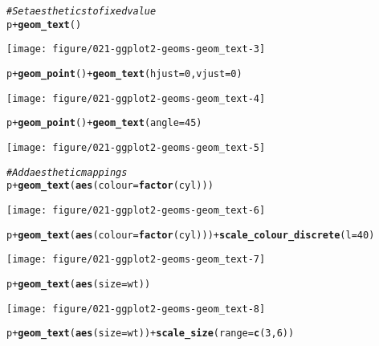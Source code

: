\documentclass[a4paper,titlepage]{tufte-handout}\usepackage[]{graphicx}\usepackage[]{color}
\makeatletter
\def\maxwidth{ %
  \ifdim\Gin@nat@width>\linewidth
    \linewidth
  \else
    \Gin@nat@width
  \fi
}
\newcommand{\hlnum}[1]{\textcolor[rgb]{0.686,0.059,0.569}{#1}}%
\newcommand{\hlcom}[1]{\textcolor[rgb]{0.678,0.584,0.686}{\textit{#1}}}%
\newcommand{\hlopt}[1]{\textcolor[rgb]{0,0,0}{#1}}%
\newcommand{\hlstd}[1]{\textcolor[rgb]{0.345,0.345,0.345}{#1}}%
\newcommand{\hlkwc}[1]{\textcolor[rgb]{0.333,0.667,0.333}{#1}}%
\newcommand{\hlkwd}[1]{\textcolor[rgb]{0.737,0.353,0.396}{\textbf{#1}}}%
\newenvironment{kframe}{%
 \def\at@end@of@kframe{}%
 \ifinner\ifhmode%
  \def\at@end@of@kframe{\end{minipage}}%
  \begin{minipage}{\columnwidth}%
 \fi\fi%
 \def\FrameCommand##1{\hskip\@totalleftmargin \hskip-\fboxsep
 \colorbox{shadecolor}{##1}\hskip-\fboxsep
     \hskip-\linewidth \hskip-\@totalleftmargin \hskip\columnwidth}%
 \MakeFramed {\advance\hsize-\width
   \@totalleftmargin\z@ \linewidth\hsize
   \@setminipage}}%
 {\par\unskip\endMakeFramed%
 \at@end@of@kframe}
\newenvironment{knitrout}{}{} %
\makeatother
\begin{document}
\begin{knitrout}
\begin{kframe}
\begin{alltt}
\hlcom{# Set aesthetics to fixed value}
\hlstd{p} \hlopt{+} \hlkwd{geom_text}\hlstd{()}
\end{alltt}
\end{kframe}
\texttt{[image: figure/021-ggplot2-geoms-geom\_text-3]} 
\begin{kframe}\begin{alltt}
\hlstd{p} \hlopt{+} \hlkwd{geom_point}\hlstd{()} \hlopt{+} \hlkwd{geom_text}\hlstd{(}\hlkwc{hjust}\hlstd{=}\hlnum{0}\hlstd{,} \hlkwc{vjust}\hlstd{=}\hlnum{0}\hlstd{)}
\end{alltt}
\end{kframe}
\texttt{[image: figure/021-ggplot2-geoms-geom\_text-4]} 
\begin{kframe}\begin{alltt}
\hlstd{p} \hlopt{+} \hlkwd{geom_point}\hlstd{()} \hlopt{+} \hlkwd{geom_text}\hlstd{(}\hlkwc{angle} \hlstd{=} \hlnum{45}\hlstd{)}
\end{alltt}
\end{kframe}
\texttt{[image: figure/021-ggplot2-geoms-geom\_text-5]} 
\begin{kframe}\begin{alltt}
\hlcom{# Add aesthetic mappings}
\hlstd{p} \hlopt{+} \hlkwd{geom_text}\hlstd{(}\hlkwd{aes}\hlstd{(}\hlkwc{colour}\hlstd{=}\hlkwd{factor}\hlstd{(cyl)))}
\end{alltt}
\end{kframe}
\texttt{[image: figure/021-ggplot2-geoms-geom\_text-6]} 
\begin{kframe}\begin{alltt}
\hlstd{p} \hlopt{+} \hlkwd{geom_text}\hlstd{(}\hlkwd{aes}\hlstd{(}\hlkwc{colour}\hlstd{=}\hlkwd{factor}\hlstd{(cyl)))} \hlopt{+} \hlkwd{scale_colour_discrete}\hlstd{(}\hlkwc{l}\hlstd{=}\hlnum{40}\hlstd{)}
\end{alltt}
\end{kframe}
\texttt{[image: figure/021-ggplot2-geoms-geom\_text-7]} 
\begin{kframe}\begin{alltt}
\hlstd{p} \hlopt{+} \hlkwd{geom_text}\hlstd{(}\hlkwd{aes}\hlstd{(}\hlkwc{size}\hlstd{=wt))}
\end{alltt}
\end{kframe}
\texttt{[image: figure/021-ggplot2-geoms-geom\_text-8]} 
\begin{kframe}\begin{alltt}
\hlstd{p} \hlopt{+} \hlkwd{geom_text}\hlstd{(}\hlkwd{aes}\hlstd{(}\hlkwc{size}\hlstd{=wt))} \hlopt{+} \hlkwd{scale_size}\hlstd{(}\hlkwc{range}\hlstd{=}\hlkwd{c}\hlstd{(}\hlnum{3}\hlstd{,}\hlnum{6}\hlstd{))}

\end{alltt}
\end{kframe}
\end{knitrout}
\end{document}

